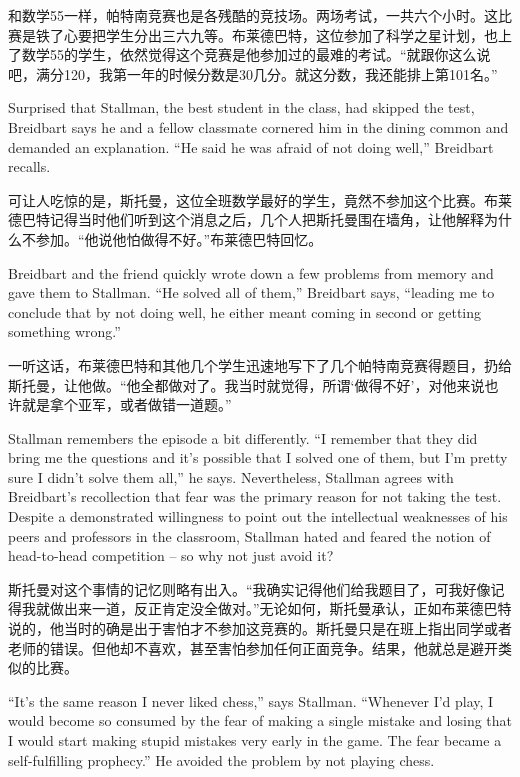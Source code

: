 \ifdefined\chs
和数学55一样，帕特南竞赛也是各残酷的竞技场。两场考试，一共六个小时。这比赛是铁了心要把学生分出三六九等。布莱德巴特，这位参加了科学之星计划，也上了数学55的学生，依然觉得这个竞赛是他参加过的最难的考试。``就跟你这么说吧，满分120，我第一年的时候分数是30几分。就这分数，我还能排上第101名。''
\fi

\ifdefined\eng
Surprised that Stallman, the best student in the class, had skipped the test, Breidbart says he and a fellow classmate cornered him in the dining common and demanded an explanation. ``He said he was afraid of not doing well,'' Breidbart recalls.
\fi

\ifdefined\chs
可让人吃惊的是，斯托曼，这位全班数学最好的学生，竟然不参加这个比赛。布莱德巴特记得当时他们听到这个消息之后，几个人把斯托曼围在墙角，让他解释为什么不参加。``他说他怕做得不好。''布莱德巴特回忆。
\fi

\ifdefined\eng
Breidbart and the friend quickly wrote down a few problems from memory and gave them to Stallman. ``He solved all of them,'' Breidbart says, ``leading me to conclude that by not doing well, he either meant coming in second or getting something wrong.''
\fi

\ifdefined\chs
一听这话，布莱德巴特和其他几个学生迅速地写下了几个帕特南竞赛得题目，扔给斯托曼，让他做。``他全都做对了。我当时就觉得，所谓`做得不好'，对他来说也许就是拿个亚军，或者做错一道题。''
\fi

\ifdefined\eng
Stallman remembers the episode a bit differently. ``I remember that they did bring me the questions and it's possible that I solved one of them, but I'm pretty sure I didn't solve them all,'' he says. Nevertheless, Stallman agrees with Breidbart's recollection that fear was the primary reason for not taking the test. Despite a demonstrated willingness to point out the intellectual weaknesses of his peers and professors in the classroom, Stallman hated and feared the notion of head-to-head competition -- so why not just avoid it?
\fi

\ifdefined\chs
斯托曼对这个事情的记忆则略有出入。``我确实记得他们给我题目了，可我好像记得我就做出来一道，反正肯定没全做对。''无论如何，斯托曼承认，正如布莱德巴特说的，他当时的确是出于害怕才不参加这竞赛的。斯托曼只是在班上指出同学或者老师的错误。但他却不喜欢，甚至害怕参加任何正面竞争。结果，他就总是避开类似的比赛。
\fi

\ifdefined\eng
``It's the same reason I never liked chess,'' says Stallman. ``Whenever I'd play, I would become so consumed by the fear of making a single mistake and losing that I would start making stupid mistakes very early in the game. The fear became a self-fulfilling prophecy.''  He avoided the problem by not playing chess.
\fi

